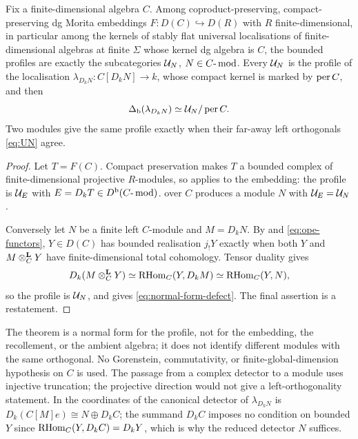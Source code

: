 \begin{theorem}\label{thm:normal-form}
Fix a finite-dimensional algebra \(C\).  Among coproduct-preserving, compact-preserving dg Morita embeddings \(F:D(C)\hookrightarrow D(R)\) with \(R\) finite-dimensional, in particular among the kernels of stably flat universal localisations of finite-dimensional algebras at finite \(\Sigma\) whose kernel dg algebra is \(C\), the bounded profiles are exactly the subcategories \(\mathcal U_N\), \(N\in C\text{-}\operatorname{mod}\).  Every \(\mathcal U_N\) is the profile of the localisation \(\lambda_{D_kN}:C[D_kN]\to k\), whose compact kernel is marked by \(\operatorname{per} C\), and then
\begin{equation}\label{eq:normal-form-defect}
 \Delta_{\mathrm b}(\lambda_{D_kN})\simeq\mathcal U_N/\operatorname{per} C .
\end{equation}
Two modules give the same profile exactly when their far-away left orthogonals \eqref{eq:UN} agree.
\end{theorem}

\begin{proof}
Let \(T=F(C)\).  Compact preservation makes \(T\) a bounded complex of finite-dimensional projective \(R\)-modules, so  applies to the embedding: the profile is \(\mathcal U_E\) with \(E=D_kT\in D^{\mathrm b}(C\text{-}\operatorname{mod})\).   over \(C\) produces a module \(N\) with \(\mathcal U_E=\mathcal U_N\).

Conversely let \(N\) be a finite left \(C\)-module and \(M=D_kN\).  By  and \eqref{eq:ope-functors}, \(Y\in D(C)\) has bounded realisation \(j_!Y\) exactly when both \(Y\) and \(M\otimes^{\mathbf L}_CY\) have finite-dimensional total cohomology.  Tensor duality gives
\[
 D_k(M\otimes^{\mathbf L}_CY)\simeq\operatorname{RHom}_C(Y,D_kM)\simeq\operatorname{RHom}_C(Y,N),
\]
so the profile is \(\mathcal U_N\), and  gives \eqref{eq:normal-form-defect}.  The final assertion is a restatement.
\end{proof}

\begin{remark}
The theorem is a normal form for the profile, not for the embedding, the recollement, or the ambient algebra; it does not identify different modules with the same orthogonal.  No Gorenstein, commutativity, or finite-global-dimension hypothesis on \(C\) is used.  The passage from a complex detector to a module uses injective truncation; the projective direction would not give a left-orthogonality statement.  In the coordinates of  the canonical detector of \(\lambda_{D_kN}\) is \(D_k(C[M]e)\cong N\oplus D_kC\); the summand \(D_kC\) imposes no condition on bounded \(Y\) since \(\operatorname{RHom}_C(Y,D_kC)=D_kY\), which is why the reduced detector \(N\) suffices.
\end{remark}

